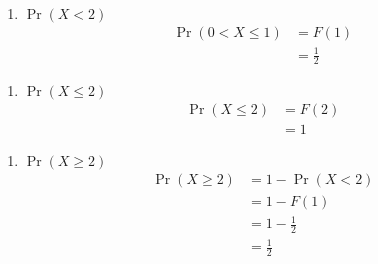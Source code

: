\documentclass{article}
\providecommand{\pr}[1]{\ensuremath{\Pr\left(#1\right)}}
\begin{document}
\begin{enumerate}
 \begin{enumerate}
        \item \pr{X < 2}
           \begin{align}
              \pr{0 < X \le 1} 
              & = F(1)\\
              & = \frac{1}{2}
        \end{align}
\end{enumerate}
\begin{enumerate}
        \item \pr{X \leq 2}
        \begin{align}
            \pr{X \le 2}
            & = F(2)\\
            & = 1   
        \end{align}
\end{enumerate}
\begin{enumerate}
        \item \pr{X \geq 2}
        \begin{align}
             \pr{X \geq 2}
               & = 1-\pr{X < 2} \\
               & = 1 - F(1)\\
               & = 1 - \frac{1}{2}\\
               & = \frac{1}{2}
        \end{align}
    \end{enumerate}
\end{enumerate}
\end{document}
